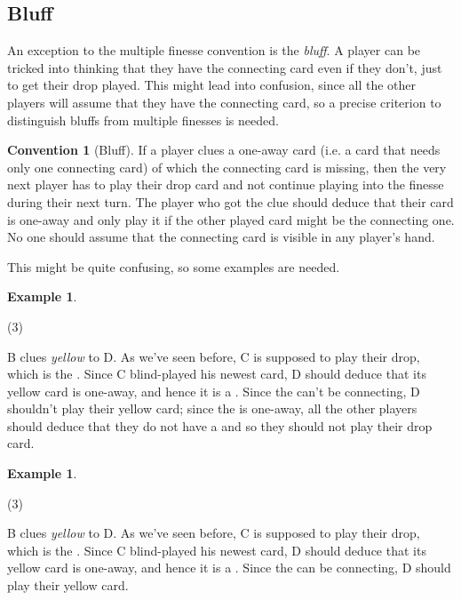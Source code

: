 \documentclass[a4paper]{article}
\theoremstyle{plain}
\theoremstyle{definition}
\newtheorem{example}[theorem]{Example}
\newtheorem{convention}[theorem]{Convention}
\begin{document}
\subsection{Bluff}

An exception to the multiple finesse convention is the \textit{bluff}. A player can be tricked into thinking that they have the connecting card even if they don't, just to get their drop played. This might lead into confusion, since all the other players will assume that they have the connecting card, so a precise criterion to distinguish bluffs from multiple finesses is needed.

\begin{convention}[Bluff]
	If a player clues a one-away card (i.e. a card that needs only one connecting card) of which the connecting card is missing, then the very next player has to play their drop card and not continue playing into the finesse during their next turn. The player who got the clue should deduce that their card is one-away and only play it if the other played card might be the connecting one. No one should assume that the connecting card is visible in any player's hand.
\end{convention}

This might be quite confusing, so some examples are needed.

\begin{example}
	\hfill
	\begin{tasks}(3)
		\task[+]      
		\task[A]    
		\task[B]    
		\task[C]    
		\task[D]    
		\task[E]    
	\end{tasks}
	
	B clues \textit{yellow} to D. As we've seen before, C is supposed to play their drop, which is the . Since C blind-played his newest card, D should deduce that its yellow card is one-away, and hence it is a . Since the  can't be connecting, D shouldn't play their yellow card; since the  is one-away, all the other players should deduce that they do not have a  and so they should not play their drop card.
\end{example}

\begin{example}
	\hfill
	\begin{tasks}(3)
		\task[+]      
		\task[A]    
		\task[B]    
		\task[C]    
		\task[D]    
		\task[E]    
	\end{tasks}
	
	B clues \textit{yellow} to D. As we've seen before, C is supposed to play their drop, which is the . Since C blind-played his newest card, D should deduce that its yellow card is one-away, and hence it is a . Since the  can be connecting, D should play their yellow card.
\end{example}
\end{document}
